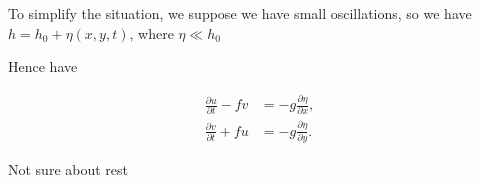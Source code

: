 \documentclass[a4paper]{article}
\begin{document}
To simplify the situation, we suppose we have small oscillations, so we have $h = h_0 + \eta(x, y, t)$, where $\eta \ll h_0$

Hence have

\begin{align*}
\frac{\partial u}{\partial t} - fv &= -g \frac{\partial \eta}{\partial x},\\
\frac{\partial v}{\partial t} + fu &= -g\frac{\partial \eta}{\partial y}.
\end{align*}

Not sure about rest
\end{document}
